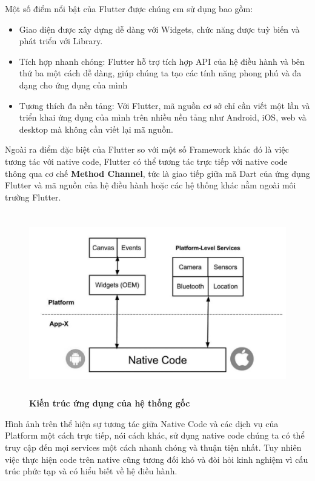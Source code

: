 Một số điểm nổi bật của Flutter được chúng em sử dụng bao gồm:

\begin{itemize}
  \item Giao diện được xây dựng dễ dàng với Widgets, chức năng được tuỳ biến và phát triển với Library.
  \item Tích hợp nhanh chóng: Flutter hỗ trợ tích hợp API của hệ điều hành và bên thứ ba một cách dễ dàng, giúp chúng ta tạo các tính năng phong phú và đa dạng cho ứng dụng của mình
  \item Tương thích đa nền tảng: Với Flutter, mã nguồn cơ sở chỉ cần viết một lần và triển khai ứng dụng của mình trên nhiều nền tảng như Android, iOS, web và desktop mà không cần viết lại mã nguồn.
\end{itemize}

Ngoài ra điểm đặc biệt của Flutter so với một số Framework khác đó là việc tương tác với native code, Flutter có thể tương
tác trực tiếp với native code thông qua cơ chế \textbf{Method Channel}, tức là giao tiếp giữa mã Dart của ứng dụng Flutter 
và mã nguồn của hệ điều hành hoặc các hệ thống khác nằm ngoài môi trường Flutter. 

\begin{figure}[H]
  \centering
  \includegraphics[width=15cm,height=8cm]{Images/system/flutter_native_code.png}
  \caption[Kiến trúc ứng dụng của hệ thống gốc]{\bfseries \fontsize{12pt}{0pt}
  \selectfont Kiến trúc ứng dụng của hệ thống gốc}
  \label{flutter_native_code} %
\end{figure}

Hình ảnh trên thể hiện sự tương tác giữa Native Code và các dịch vụ của Platform một cách trực tiếp, nói cách khác, sử dụng
native code chúng ta có thể truy cập đến mọi services một cách nhanh chóng và thuận tiện nhất. Tuy nhiên việc thực hiện
code trên native cũng tương đối khó và đòi hỏi kinh nghiệm vì cấu trúc phức tạp và có hiểu biết về hệ điều hành.

